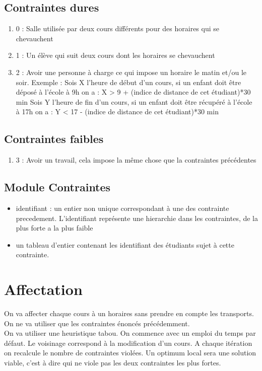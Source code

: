\documentclass[a4paper,11pt]{article}
\begin{document}
	\subsection{Contraintes dures}
		\begin{enumerate}
			\item 0 : Salle utilisée par deux cours différents pour des horaires 
			qui se chevauchent
			\item 1 : Un élève qui suit deux cours dont les horaires se chevauchent
			\item 2 : Avoir une personne à charge ce qui impose un horaire le matin et/ou le soir.
			Exemple : Sois X l'heure de début d'un cours, si un enfant doit être déposé à l'école à 9h on a : X > 9 + (indice de distance de cet étudiant)*30 min
			Sois Y l'heure de fin d'un cours, si un enfant doit être récupéré à l'école à 17h on a : Y < 17 - (indice de distance de cet étudiant)*30 min			
		\end{enumerate}
	\subsection{Contraintes faibles}
		\begin{enumerate}
			\item 3 : Avoir un travail, cela impose la même chose que la contraintes précédentes
		\end{enumerate}
	\subsection{Module Contraintes}
		\begin{itemize}
			\item identifiant : un entier non unique correspondant à une des contrainte precedement. L'identifiant représente une hierarchie dans les contraintes, de la plus forte a la plus faible 
			\item un tableau d'entier contenant les identifiant des étudiants sujet à cette contrainte.
		\end{itemize}
\section{Affectation}
	On va affecter chaque cours à un horaires sans prendre en compte les transports. On ne va utiliser que les contraintes énoncés précédemment. \\
	On va utiliser une heuristique tabou. On commence avec un emploi du temps par défaut. Le voisinage correspond à la modification d'un cours. A chaque itération on recalcule le nombre de contraintes violées. Un optimum local sera une solution viable, c'est à dire qui ne viole pas les deux contraintes les plus fortes. 
	
\end{document}
